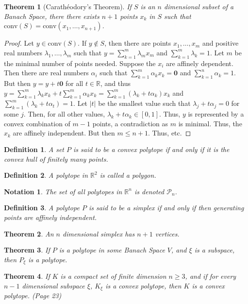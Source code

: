 \documentclass[crop=false,class=book]{standalone}
\theoremstyle{mystyle}
\newtheorem{theorem}{Theorem}[section]
\newtheorem{definition}{Definition}[section]
\newtheorem{notation}{Notation}[section]
\begin{document}
\begin{theorem}[Carath\'{e}odory's Theorem]
If $S$ is an $n$ dimensional subset of a Banach Space, there there exists $n+1$ points $x_k$ in $S$ such that $\textrm{conv}(S) = \textrm{conv}(x_1,\hdots, x_{n+1})$.
\end{theorem}
\begin{proof}
Let $y\in \textrm{conv}(S)$. If $y\notin S$, then there are points $x_1,\hdots, x_m$ and positive real numbers $\lambda_1,\hdots, \lambda_m$ such that $y=\sum_{k=1}^{m}\lambda_m x_m$ and $\sum_{k=1}^{m}\lambda_k = 1$. Let $m$ be the minimal number of points needed. Suppose the $x_i$ are affinely dependent. Then there are real numbers $\alpha_i$ such that $\sum_{k=1}^{m}\alpha_k x_k = \mathbf{0}$ and $\sum_{k=1}^{n}\alpha_k =1$. But then $y = y+t\mathbf{0}$ for all $t\in \mathbb{R}$, and thus $y = \sum_{k=1}^{m}\lambda_k x_k + t\sum_{k=1}^{m}\alpha_k x_k = \sum_{k=1}^{m}(\lambda_k + t\alpha_k)x_k$ and $\sum_{k=1}^{m}(\lambda_k+t\alpha_t) = 1$. Let $|t|$ be the smallest value such that $\lambda_j + t\alpha_j = 0$ for some $j$. Then, for all other values, $\lambda_k + t\alpha_k \in [0,1]$. Thus, $y$ is represented by a convex combination of $m-1$ points, a contradiction as $m$ is minimal. Thus, the $x_k$ are affinely independent. But then $m \leq n+1$. Thus, etc.
\end{proof}
\begin{definition}
A set $P$ is said to be a convex polytope if and only if it is the convex hull of finitely many points.
\end{definition}
\begin{definition}
A polytope in $\mathbb{R}^2$ is called a polygon.
\end{definition}
\begin{notation}
The set of all polytopes in $\mathbb{R}^n$ is denoted $\mathscr{P}_n$.
\end{notation}
\begin{definition}
A polytope $P$ is said to be a simplex if and only if then generating points are affinely independent.
\end{definition}
\begin{theorem}
An $n$ dimensional simplex has $n+1$ vertices.
\end{theorem}
\begin{theorem}
If $P$ is a polytope in some Banach Space $V$, and $\xi$ is a subspace, then $P_{\xi}$ is a polytope.
\end{theorem}
\begin{theorem}
If $K$ is a compact set of finite dimension $n\geq 3$, and if for every $n-1$ dimensional subspace $\xi$, $K_{\xi}$ is a convex polytope, then $K$ is a convex polytope. (Page 23)
\end{theorem}
\end{document}
